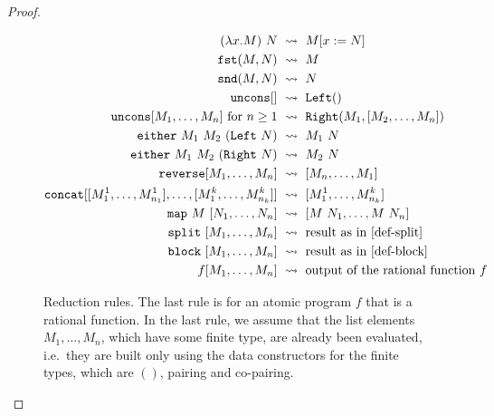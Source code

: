 \begin{proof}
        \begin{figure}
         \begin{align*}
                    (\lambda x. M)\ N & \ \leadsto \ M[x:=N] \\
     \fstterm (M,N) & \ \leadsto \ M \\
     \sndterm (M,N) &  \ \leadsto  \  N \\
        \mathtt{uncons} []   & \ \leadsto  \ \leftterm ()  \\
        \mathtt{uncons} [M_1,\ldots,M_n] \text{ for $n \ge 1$} & \  \leadsto  \ \rightterm (M_1, [M_2,\ldots,M_n]) \\
        \casesterm \ M_1\  M_2\  (\leftterm\  N) &  \ \leadsto \  M_1\ N \\
        \casesterm \ M_1\  M_2\  (\rightterm\  N) & \  \leadsto  \ M_2\ N \\ 
        \reverseterm [M_1,\ldots,M_n]  & \ \leadsto \ [M_n, \ldots, M_1] \\
        \concatterm [[M^1_{1},\ldots,M^1_{n_1}],\ldots, [M^{k}_{1},\ldots,M^{k}_{n_k}]] & \ \leadsto \ [M^1_1,\ldots,M^k_{n_k}] \\ 
        \mapterm\  M\  [N_1,\ldots,N_n] & \ \leadsto \ [M\ N_1,\ldots,M\ N_n]\\
        \splitterm\ [M_1,\ldots, M_n] & \ \leadsto \ \text{result as in \eqref{def-split}} \\
        \blockterm\ [M_1,\ldots, M_n] & \ \leadsto \ \text{result as in \eqref{def-block}} \\
        f[M_1,\ldots,M_n] & \ \leadsto \ \text{output of the rational function $f$}    \end{align*}
    \caption{\label{fig:reduction-rules} Reduction rules. The last rule is for an atomic program $f$ that is a rational function. In the last rule, we assume that the list elements $M_1,\ldots,M_n$, which have some finite type, are already been evaluated, i.e.~they are built only using the data constructors for the finite types, which are $()$, pairing and co-pairing.
}
    \end{figure}



\end{proof}

